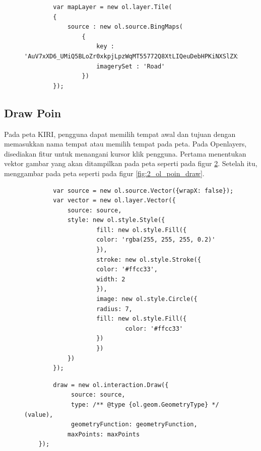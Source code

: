 \begin{figure}[H]
	\centering
	
	\begin{lstlisting}
		var mapLayer = new ol.layer.Tile(
        {
            source : new ol.source.BingMaps(
                {
                    key : 'AuV7xXD6_UMiQ5BLoZr0xkpjLpzWqMT55772Q8XtLIQeuDebHPKiNXSlZXxEr1GA',
                    imagerySet : 'Road'
                })
        });
	\end{lstlisting}

	\label{fig:2_ol_bing}
\end{figure}

\subsection{Draw Poin}
Pada peta KIRI, pengguna dapat memilih tempat awal dan tujuan dengan memasukkan nama tempat atau memilih tempat pada peta. Pada Openlayers, disediakan fitur untuk menangani kursor klik pengguna. Pertama menentukan vektor gambar yang akan ditampilkan pada peta seperti pada figur \ref{fig:2_ol_poin_vector}. Setelah itu, menggambar pada peta seperti pada figur \ref{fig:2_ol_poin_draw}.


\begin{figure}[H]
	\centering
	
	\begin{lstlisting}
		var source = new ol.source.Vector({wrapX: false});
		var vector = new ol.layer.Vector({
  			source: source,
 			style: new ol.style.Style({
    				fill: new ol.style.Fill({
      				color: 'rgba(255, 255, 255, 0.2)'
    				}),
    				stroke: new ol.style.Stroke({
      				color: '#ffcc33',
      				width: 2
    				}),
    				image: new ol.style.Circle({
      				radius: 7,
      				fill: new ol.style.Fill({
        					color: '#ffcc33'
      				})
    				})
  			})
		});
	\end{lstlisting}

	\label{fig:2_ol_poin_vector}
\end{figure}

\begin{figure}[H]
	\centering
	
	\begin{lstlisting}
		draw = new ol.interaction.Draw({
     		 source: source,
      		 type: /** @type {ol.geom.GeometryType} */ (value),
     		 geometryFunction: geometryFunction,
      		maxPoints: maxPoints
    });
	\end{lstlisting}

	\label{fig:2_ol_draw}
\end{figure}



